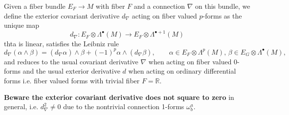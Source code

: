 \begin{mytheorem}
%
Given a fiber bundle $E_F \to M$ with fiber $F$ and a connection $\nabla$ on this bundle, we define the exterior covariant derivative $d_\nabla$ acting on fiber valued $p$-forms as the unique map
\begin{equation}
    d_\nabla: E_F \otimes \Lambda^\bullet (M)  \to E_F \otimes \Lambda^{\bullet +1} (M)
\end{equation}
thta is linear, satisfies the Leibniz rule 
\begin{equation}
    d_\nabla(\alpha \wedge \beta) = (d_\nabla \alpha) \wedge \beta + (-1)^p \alpha \wedge (d_\nabla \beta),\qquad \alpha \in E_F \otimes \Lambda^p (M),\, \beta \in E_G \otimes \Lambda^\bullet (M),
\end{equation}
and reduces to the usual covariant derivative $\nabla$ when acting on fiber valued $0$-forms and the usual exterior derivative $d$ when acting on ordinary differential forms i.e. fiber valued forms with trivial fiber $F = \mathbb{R}$.

\textbf{Beware  the exterior covariant derivative does not square to zero} in general, i.e. $d_\nabla^2 \neq 0$ due to the nontrivial connection 1-forms $\omega^a_b$.
\smallskip


\end{mytheorem}
